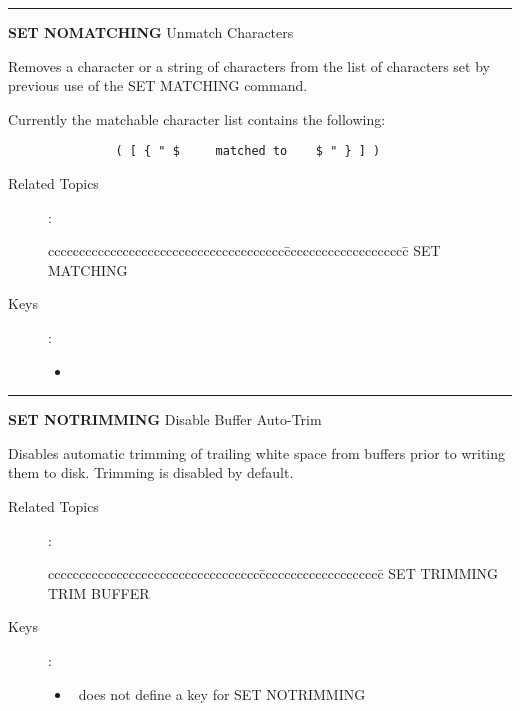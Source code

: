 \goodbreak

\rule{\textwidth}{0.3mm}

{\Large {\bf SET NOMATCHING} \hfill Unmatch Characters}

\medskip
  Removes a character or a string of characters from the list of characters
  set by previous use of the SET MATCHING command.

  Currently the matchable character list contains the following:
\begin{verbatim}
               ( [ { " $     matched to    $ " } ] )
\end{verbatim}

\begin{description}
\item[Related Topics]:
\begin{tabbing}
cccccccccccccccccccccccccccccccccccccc\=cccccccccccccccccccc\=\kill
    SET MATCHING \\
\end{tabbing}

\item[Keys]:
       \begin{itemize}
       \item \gold\ 
       \end{itemize}

\end{description}

\goodbreak

\rule{\textwidth}{0.3mm}

{\Large {\bf SET NOTRIMMING} \hfill Disable Buffer Auto-Trim}

\medskip
  Disables automatic trimming of trailing white space from buffers
  prior to writing them to disk. Trimming is disabled by default.

\begin{description}
\item[Related Topics]:
\begin{tabbing}
cccccccccccccccccccccccccccccccccc\=cccccccccccccccccccc\=\kill
    SET TRIMMING \>   TRIM BUFFER \\
\end{tabbing}

\item[Keys]:
          \begin{itemize}
          \item \STEve\ does not define a key for SET NOTRIMMING
          \end{itemize}
\end{description}


